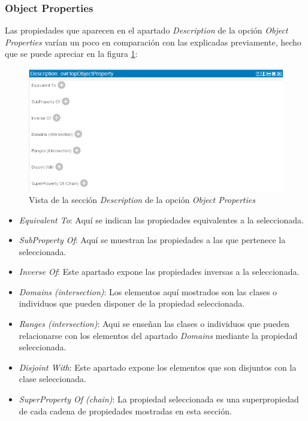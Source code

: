 \subsubsection{Object Properties}
Las propiedades que aparecen en el apartado \textit{Description} de la opción 
\textit{Object Properties} varían un poco en comparación con las explicadas 
previamente, hecho que se puede apreciar en la figura \ref*{ObjectProperties_description}:

\begin{figure}[H]
    \centering
    \includegraphics[scale=0.8]{Figures/Protege/ObjectProperties_description.png}
    \caption{Vista de la sección \textit{Description} de la opción \textit{Object Properties}}
    \label{ObjectProperties_description}
\end{figure}

\begin{itemize}
    \item \textit{Equivalent To}: Aquí se indican las propiedades equivalentes a la seleccionada.
    \item \textit{SubProperty Of}: Aquí se muestran las propiedades a las que pertenece la seleccionada.
    \item \textit{Inverse Of}: Este apartado expone las propiedades inversas a la seleccionada.
    \item \textit{Domains (intersection)}: Los elementos aquí mostrados son las clases o individuos que pueden 
    disponer de la propiedad seleccionada.
    \item \textit{Ranges (intersection)}: Aqui se enseñan las clases o individuos que pueden relacionarse con los elementos 
    del apartado \textit{Domains} mediante la propiedad seleccionada.
    \item \textit{Disjoint With}: Este apartado expone los elementos que son disjuntos con la clase seleccionada.
    \item \textit{SuperProperty Of (chain)}: La propiedad seleccionada es una superpropiedad de cada cadena de propiedades 
    mostradas en esta sección.
\end{itemize}


